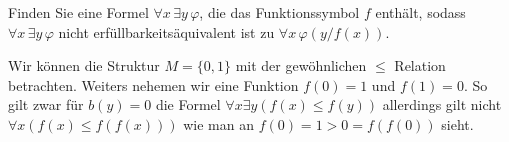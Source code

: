 
\begin{exercise}[176]
Finden Sie eine Formel $\forall x\, \exists y\, \varphi$, die das Funktionssymbol $f$
enthält, sodass $\forall x\, \exists y\, \varphi$ nicht erfüllbarkeitsäquivalent ist zu
$\forall x\, \varphi(y/f(x))$.
\end{exercise}


\begin{solution}
	Wir können die Struktur $M = \{0, 1\}$ mit der gewöhnlichen $\leq$ Relation betrachten. Weiters nehemen wir eine Funktion $f(0) = 1$ und $f(1) = 0$. So gilt zwar für $b(y) = 0$ die Formel $\forall x \exists y (f(x) \leq f(y))$ allerdings gilt nicht $\forall x (f(x) \leq f(f(x)))$ wie man an $f(0) = 1 > 0 = f(f(0))$ sieht. 
\end{solution}

